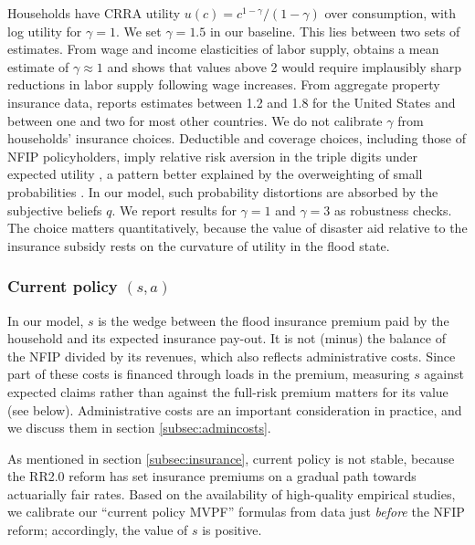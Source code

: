 \documentclass[12pt]{article}
\begin{document}
Households have CRRA utility $u(c)=c^{1-\gamma}/(1-\gamma)$ over consumption, with log utility for $\gamma=1$. We set $\gamma=1.5$ in our baseline. This lies between two sets of estimates. From wage and income elasticities of labor supply, \cite{chetty2006new} obtains a mean estimate of $\gamma\approx1$ and shows that values above 2 would require implausibly sharp reductions in labor supply following wage increases. From aggregate property insurance data, \cite{szpiro1986relative} reports estimates between 1.2 and 1.8 for the United States and between one and two for most other countries. We do not calibrate $\gamma$ from households' insurance choices. Deductible and coverage choices, including those of NFIP policyholders, imply relative risk aversion in the triple digits under expected utility \citep{sydnor2010overinsuring,collier2017risk}, a pattern better explained by the overweighting of small probabilities \citep{barseghyan2013nature}. In our model, such probability distortions are absorbed by the subjective beliefs $q$. We report results for $\gamma=1$ and $\gamma=3$ as robustness checks. The choice matters quantitatively, because the value of disaster aid relative to the insurance subsidy rests on the curvature of utility in the flood state.

\subsubsection{Current policy \texorpdfstring{$(s,a)$}{(s,a)}}

In our model, $s$ is the wedge between the flood insurance premium paid by the household and its expected insurance pay-out. It is not (minus) the balance of the NFIP divided by its revenues, which also reflects administrative costs. Since part of these costs is financed through loads in the premium, measuring $s$ against expected claims rather than against the full-risk premium matters for its value (see below). Administrative costs are an important consideration in practice, and we discuss them in section \ref{subsec:admincosts}.

As mentioned in section \ref{subsec:insurance}, current policy is not stable, because the RR2.0 reform has set insurance premiums on a gradual path towards actuarially fair rates. Based on the availability of high-quality empirical studies, we calibrate our ``current policy MVPF'' formulas from data just \textit{before} the NFIP reform; accordingly, the value of $s$ is positive.
\end{document}
